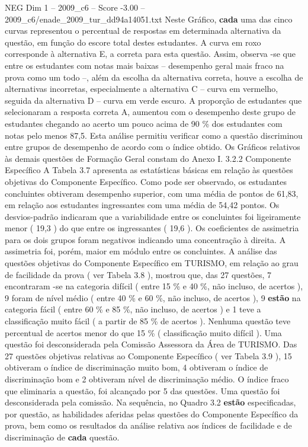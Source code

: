 \begin{textsample}{NEG Dim 1 – 2009\_c6 – Score -3.00 – 2009\_c6/enade\_2009\_tur\_dd94a14051.txt}
Neste Gráfico, \textbf{cada} uma das cinco curvas representou o percentual de respostas em determinada alternativa da questão, em função do escore total destes estudantes.
A curva em roxo corresponde à alternativa E, a correta para esta questão.
Assim, observa -se que entre os estudantes com notas mais baixas – desempenho geral mais fraco na prova como um todo –, além da escolha da alternativa correta, houve a escolha de alternativas incorretas, especialmente a alternativa C – curva em vermelho, seguida da alternativa D – curva em verde escuro.
A proporção de estudantes que selecionaram a resposta correta A, aumentou com o desempenho deste grupo de estudantes chegando ao acerto um pouco acima de 90 \% dos estudantes com notas pelo menos 87,5.
Esta análise permitiu verificar como a questão discriminou entre grupos de desempenho de acordo com o índice obtido.
Os Gráficos relativos às demais questões de Formação Geral constam do Anexo I. 3.2.2 Componente Específico A Tabela 3.7 apresenta as estatísticas básicas em relação às questões objetivas do Componente Específico.
Como pode ser observado, os estudantes concluintes obtiveram desempenho superior, com uma média de pontos de 61,83, em relação aos estudantes ingressantes com uma média de 54,42 pontos.
Os desvios-padrão indicaram que a variabilidade entre os concluintes foi ligeiramente menor ( 19,3 ) do que entre os ingressantes ( 19,6 ).
Os coeficientes de assimetria para os dois grupos foram negativos indicando uma concentração à direita.
A assimetria foi, porém, maior em módulo entre os concluintes.
A análise das questões objetivas do Componente Específico em TURISMO, em relação ao grau de facilidade da prova ( ver Tabela 3.8 ), mostrou que, das 27 questões, 7 encontraram -se na categoria difícil ( entre 15 \% e 40 \%, não incluso, de acertos ), 9 foram de nível médio ( entre 40 \% e 60 \%, não incluso, de acertos ), 9 \textbf{estão} na categoria fácil ( entre 60 \% e 85 \%, não incluso, de acertos ) e 1 teve a classificação muito fácil ( a partir de 85 \% de acertos ).
Nenhuma questão teve percentual de acertos menor do que 15 \% ( classificação muito difícil ).
Uma questão foi desconsiderada pela Comissão Assessora da Área de TURISMO.
Das 27 questões objetivas relativas ao Componente Específico ( ver Tabela 3.9 ), 15 obtiveram o índice de discriminação muito bom, 4 obtiveram o índice de discriminação bom e 2 obtiveram nível de discriminação médio.
O índice fraco que eliminaria a questão, foi alcançado por 5 das questões.
Uma questão foi desconsiderada pela comissão.
Na sequência, no Quadro 3.2 \textbf{estão} especificadas, por questão, as habilidades aferidas pelas questões do Componente Específico da prova, bem como os resultados da análise relativa aos índices de facilidade e de discriminação de \textbf{cada} questão.

\end{textsample}
